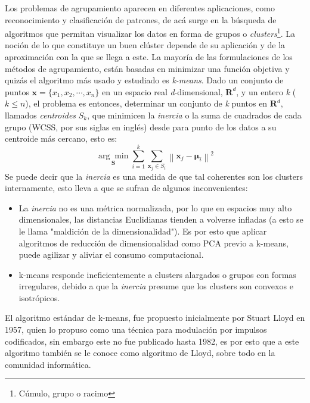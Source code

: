 \documentclass[12pt,letterpaper,oneside,openright]{book}
\begin{document}
	Los problemas de agrupamiento aparecen en diferentes aplicaciones, como reconocimiento y clasificación de patrones, de acá surge en la búsqueda de algoritmos que permitan visualizar los datos en forma de grupos o \textit{clusters}\footnote{Cúmulo, grupo o racimo}. La noción de lo que constituye un buen clúster depende de su aplicación y de la aproximación con la que se llega a este. La mayoría de las formulaciones de los métodos de agrupamiento, están basadas en minimizar una función objetiva y quizás el algoritmo más usado y estudiado es \textit{k-means}. Dado un conjunto de puntos $\mathbf{x}=\{x_1,x_2,\dotsb,x_n\}$ en un espacio real \textit{d}-dimensional, $\mathbf{R}^d$, y un entero \textit{k} ($k \leq n$), el problema es entonces, determinar un conjunto de \textit{k} puntos en $\mathbf{R}^d$, llamados \textit{centroides} $S_k$, que minimicen la \textit{inercia} o la suma de cuadrados de cada grupo (WCSS, por sus siglas en inglés) desde para punto de los datos a su centroide más cercano, esto es: 
	\begin{equation}
		\label{eq:min_k_means}
		\underset{\mathbf{S}}{\arg \min } \sum_{i=1}^k \sum_{\mathbf{x}_j \in S_i}\left\|\mathbf{x}_j-\boldsymbol{\mu}_i\right\|^2
	\end{equation}
	Se puede decir que la \textit{inercia} es una medida de que tal coherentes son los clusters internamente, esto lleva a que se sufran de algunos inconvenientes:
	\begin{itemize}
		\item La \textit{inercia} no es una métrica normalizada, por lo que en espacios muy alto dimensionales, las distancias Euclidianas tienden a volverse infladas (a esto se le llama "maldición de la dimensionalidad"). Es por esto que aplicar algoritmos de reducción de dimensionalidad como PCA previo a k-means, puede agilizar y aliviar el consumo computacional.
		\item k-means responde ineficientemente a clusters alargados o grupos con formas irregulares, debido a que la \textit{inercia} presume que los clusters son convexos e isotrópicos.
	\end{itemize}
	El algoritmo estándar de k-means, fue propuesto inicialmente por Stuart Lloyd en 1957, quien lo propuso como una técnica para modulación por impulsos codificados, sin embargo este no fue publicado hasta 1982, es por esto que a este algoritmo también se le conoce como algoritmo de Lloyd, sobre todo en la comunidad informática. \\
	
\end{document}
